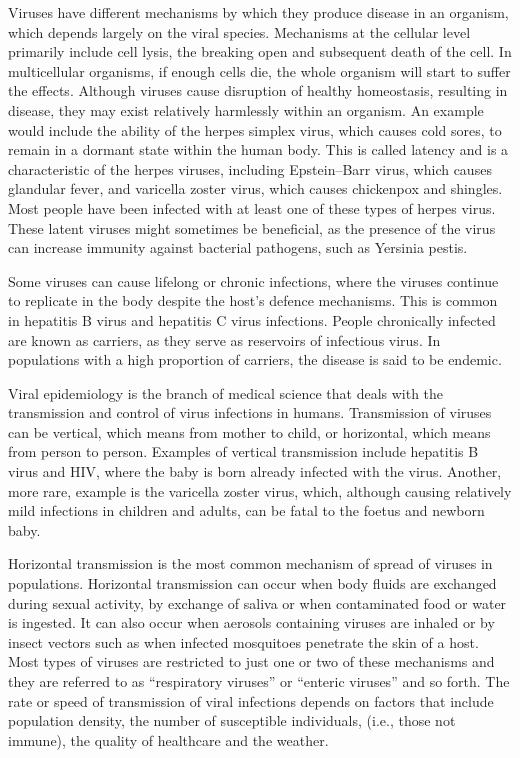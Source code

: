 Viruses have different mechanisms by which they produce disease in an organism, which depends largely on the viral species. Mechanisms at the cellular level primarily include cell lysis, the breaking open and subsequent death of the cell. In multicellular organisms, if enough cells die, the whole organism will start to suffer the effects. Although viruses cause disruption of healthy homeostasis, resulting in disease, they may exist relatively harmlessly within an organism. An example would include the ability of the herpes simplex virus, which causes cold sores, to remain in a dormant state within the human body. This is called latency and is a characteristic of the herpes viruses, including Epstein--Barr virus, which causes glandular fever, and varicella zoster virus, which causes chickenpox and shingles. Most people have been infected with at least one of these types of herpes virus. These latent viruses might sometimes be beneficial, as the presence of the virus can increase immunity against bacterial pathogens, such as Yersinia pestis.

Some viruses can cause lifelong or chronic infections, where the viruses continue to replicate in the body despite the host's defence mechanisms. This is common in hepatitis B virus and hepatitis C virus infections. People chronically infected are known as carriers, as they serve as reservoirs of infectious virus. In populations with a high proportion of carriers, the disease is said to be endemic.

Viral epidemiology is the branch of medical science that deals with the transmission and control of virus infections in humans. Transmission of viruses can be vertical, which means from mother to child, or horizontal, which means from person to person. Examples of vertical transmission include hepatitis B virus and HIV, where the baby is born already infected with the virus. Another, more rare, example is the varicella zoster virus, which, although causing relatively mild infections in children and adults, can be fatal to the foetus and newborn baby.

Horizontal transmission is the most common mechanism of spread of viruses in populations. Horizontal transmission can occur when body fluids are exchanged during sexual activity, by exchange of saliva or when contaminated food or water is ingested. It can also occur when aerosols containing viruses are inhaled or by insect vectors such as when infected mosquitoes penetrate the skin of a host. Most types of viruses are restricted to just one or two of these mechanisms and they are referred to as ``respiratory viruses'' or ``enteric viruses'' and so forth. The rate or speed of transmission of viral infections depends on factors that include population density, the number of susceptible individuals, (i.e., those not immune), the quality of healthcare and the weather.

